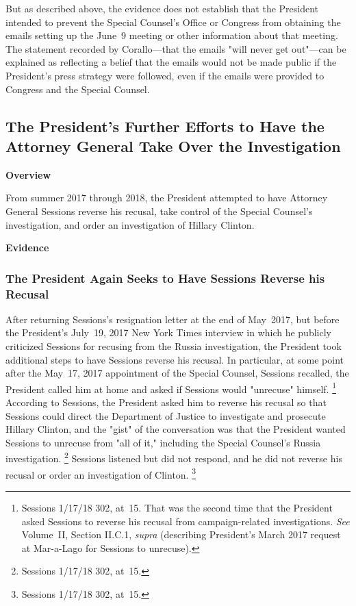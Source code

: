 But as described above, the evidence does not establish that the President intended to prevent the Special Counsel's Office or Congress from obtaining the emails setting up the June~9 meeting or other information about that meeting.
The statement recorded by Corallo---that the emails "will never get out"---can be explained as reflecting a belief that the emails would not be made public if the President's press strategy were followed, even if the emails were provided to Congress and the Special Counsel.

\subsection{The President's Further Efforts to Have the Attorney General Take Over the Investigation}

\begin{center}
\textbf{Overview}
\end{center}

From summer 2017 through 2018, the President attempted to have Attorney General Sessions reverse his recusal, take control of the Special Counsel's investigation, and order an investigation of Hillary Clinton.

\begin{center}
\textbf{Evidence}
\end{center}

\subsubsection{The President Again Seeks to Have Sessions Reverse his Recusal}

After returning Sessions's resignation letter at the end of May~2017, but before the President's July~19, 2017 New York Times interview in which he publicly criticized Sessions for recusing from the Russia investigation, the President took additional steps to have Sessions reverse his recusal.
In particular, at some point after the May~17, 2017 appointment of the Special Counsel, Sessions recalled, the President called him at home and asked if Sessions would "unrecuse" himself.%
\footnote{Sessions 1/17/18 302, at~15.
That was the second time that the President asked Sessions to reverse his recusal from campaign-related investigations.
\textit{See} Volume~II, Section II.C.1, \textit{supra} (describing President's March 2017 request at Mar-a-Lago for Sessions to unrecuse).
}
According to Sessions, the President asked him to reverse his recusal so that Sessions could direct the Department of Justice to investigate and prosecute Hillary Clinton, and the "gist" of the conversation was that the President wanted Sessions to unrecuse from "all of it," including the Special Counsel's Russia investigation.%
\footnote{Sessions 1/17/18 302, at~15.}
Sessions listened but did not respond, and he did not reverse his recusal or order an investigation of Clinton.%
\footnote{Sessions 1/17/18 302, at~15.}


